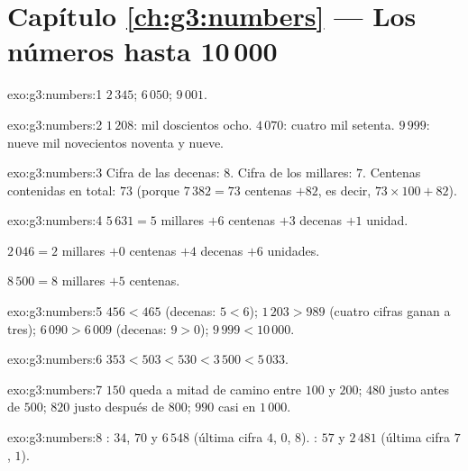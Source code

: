 \section*{Capítulo \ref{ch:g3:numbers} --- Los números hasta 10\,000}

\begin{solution}{exo:g3:numbers:1}
$2\,345$; \quad $6\,050$; \quad $9\,001$.
\end{solution}

\begin{solution}{exo:g3:numbers:2}
$1\,208$: mil doscientos ocho. \quad
$4\,070$: cuatro mil setenta. \quad
$9\,999$: nueve mil novecientos noventa y nueve.
\end{solution}

\begin{solution}{exo:g3:numbers:3}
Cifra de las decenas: $8$. Cifra de los millares: $7$. Centenas contenidas en total:
$73$ (porque $7\,382 = 73$ centenas $+ 82$, es decir,
$73 \times 100 + 82$).
\end{solution}

\begin{solution}{exo:g3:numbers:4}
$5\,631 = 5$ millares $+ 6$ centenas $+ 3$ decenas $+ 1$ unidad.

$2\,046 = 2$ millares $+ 0$ centenas $+ 4$ decenas $+ 6$ unidades.

$8\,500 = 8$ millares $+ 5$ centenas.
\end{solution}

\begin{solution}{exo:g3:numbers:5}
$456 < 465$ (decenas: $5 < 6$); \quad
$1\,203 > 989$ (cuatro cifras ganan a tres); \quad
$6\,090 > 6\,009$ (decenas: $9 > 0$); \quad
$9\,999 < 10\,000$.
\end{solution}

\begin{solution}{exo:g3:numbers:6}
$353 < 503 < 530 < 3\,500 < 5\,033$.
\end{solution}

\begin{solution}{exo:g3:numbers:7}
$150$ queda a mitad de camino entre $100$ y $200$; $480$ justo antes de
$500$; $820$ justo después de $800$; $990$ casi en $1\,000$.
\end{solution}

\begin{solution}{exo:g3:numbers:8}
: $34$, $70$ y $6\,548$ (última cifra $4$, $0$, $8$). : $57$
y $2\,481$ (última cifra $7$, $1$).
\end{solution}

